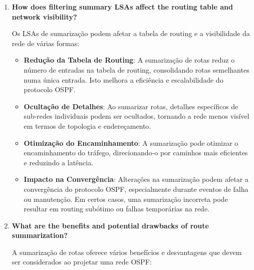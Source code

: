\documentclass[11pt,english, openright, oneside]{book}
\begin{document}
\begin{enumerate}
  \item \textbf{How does filtering summary LSAs affect the routing table and network visibility?}
  \vspace{0.2cm}

  Os LSAs de sumarização podem afetar a tabela de routing e a visibilidade da rede de várias formas:
  \vspace{0.2cm}

  \begin{itemize}
    \item \textbf{Redução da Tabela de Routing}: A sumarização de rotas reduz o número de entradas na tabela de routing, consolidando rotas semelhantes numa única entrada. Isto melhora a eficiência e escalabilidade do protocolo OSPF.
    \item \textbf{Ocultação de Detalhes}: Ao sumarizar rotas, detalhes específicos de sub-redes individuais podem ser ocultados, tornando a rede menos visível em termos de topologia e endereçamento.
    \item \textbf{Otimização do Encaminhamento}: A sumarização pode otimizar o encaminhamento do tráfego, direcionando-o por caminhos mais eficientes e reduzindo a latência.
    \item \textbf{Impacto na Convergência}: Alterações na sumarização podem afetar a convergência do protocolo OSPF, especialmente durante eventos de falha ou manutenção. Em certos casos, uma sumarização incorreta pode resultar em routing subótimo ou falhas temporárias na rede.
  \end{itemize}
  \vspace{0.2cm}

  \item \textbf{What are the benefits and potential drawbacks of route summarization?}
  \vspace{0.2cm}

  A sumarização de rotas oferece vários benefícios e desvantagens que devem ser considerados ao projetar uma rede OSPF:
  \vspace{0.2cm}


\end{enumerate}
\end{document}
